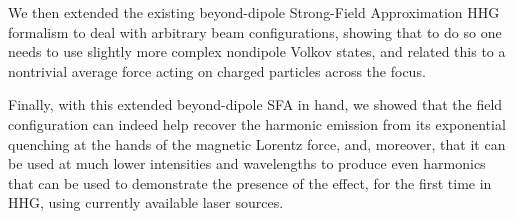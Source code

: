 We then extended the existing beyond-dipole Strong-Field Approximation HHG formalism to deal with arbitrary beam configurations, showing that to do so one needs to use slightly more complex nondipole Volkov states, and related this to a nontrivial average force acting on charged particles across the focus.

Finally, with this extended beyond-dipole SFA in hand, we showed that the field configuration can indeed help recover the harmonic emission from its exponential quenching at the hands of the magnetic Lorentz force, and, moreover, that it can be used at much lower intensities and wavelengths to produce even harmonics that can be used to demonstrate the presence of the effect, for the first time in HHG, using currently available laser sources.





















  